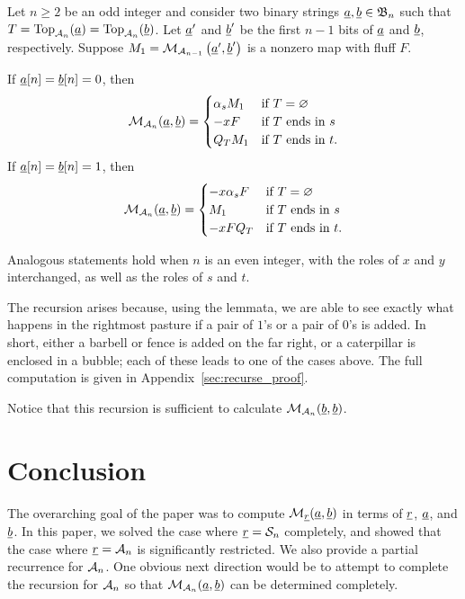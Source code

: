 \begin{proposition}
	Let $n \ge 2$ be an odd integer and consider two binary strings $\ul a, \ul b \in \BB_n$ such that $T = \Top_{\AA_n}(\ul a) = \Top_{\AA_n}(\ul b)$.  
	Let $\ul a'$ and $\ul b'$ be the first $n-1$ bits of $\ul a$ and $\ul b$, respectively. 
	Suppose $M_1 = \MM_{\AA_{n-1}} \left(\ul a', \ul b'\right)$ is a nonzero map with fluff $F$.
	\begin{enumerate}[(i)]
		\ii If $\ul a[n] = \ul b[n] = 0$, then
		\[ \MM_{\AA_n} (\ul a, \ul b)
			=
			\begin{cases}
				\alpha_s M_1 & \text{if $T = \varnothing$} \\ %
				-xF & \text{if $T$ ends in $s$} \\ %
				 Q_T M_1 & \text{if $T$ ends in $t$}. \\ %
			\end{cases}
		\]
		\ii If $\ul a[n] = \ul b[n] = 1$, then
		\[
			\MM_{\AA_n} (\ul a, \ul b)
			=
			\begin{cases}
				-x\alpha_sF & \text{if $T = \varnothing$} \\ %
				M_1 & \text{if $T$ ends in $s$} \\ %
				-xF Q_T & \text{if $T$ ends in $t$}. %
			\end{cases}
		\]
	\end{enumerate}
	Analogous statements hold when $n$ is an even integer, with the roles of $x$ and $y$ interchanged, as well as the roles of $s$ and $t$.
	\label{thm:recurse}
\end{proposition}
The recursion arises because, using the lemmata, we are able to see exactly what happens in the rightmost pasture if a pair of $1$'s or a pair of $0$'s is added.  In short, either a barbell or fence is added on the far right, or a caterpillar is enclosed in a bubble; each of these leads to one of the cases above.  The full computation is given in Appendix~\ref{sec:recurse_proof}.

Notice that this recursion is sufficient to calculate $\MM_{\AA_n}(\ul b, \ul b)$.


\section{Conclusion}
The overarching goal of the paper was to compute $\MM_{\ul r} (\ul a, \ul b)$ in terms of $\ul r$, $\ul a$, and $\ul b$.  In this paper, we solved the case where $\ul r = \SS_n$ completely, and showed that the case where $\ul r = \AA_n$ is significantly restricted.  We also provide a partial recurrence for $\AA_n$.  One obvious next direction would be to attempt to complete the recursion for $\AA_n$ so that $\MM_{\AA_n} (\ul a, \ul b)$ can be determined completely.

